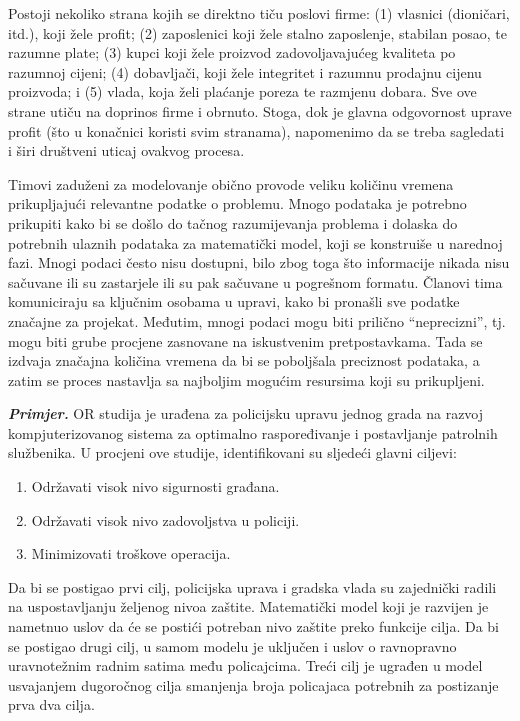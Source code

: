 \documentclass[a4paper, utf8, 11pt, colorlinks]{book}
\begin{document}
Postoji nekoliko strana kojih se direktno tiču poslovi firme: (1) vlasnici (dioničari, itd.), koji žele profit;   (2) zaposlenici koji žele stalno zaposlenje, stabilan posao, te razumne plate; (3) kupci koji žele proizvod zadovoljavajućeg kvaliteta po razumnoj cijeni;
(4) dobavljači, koji žele integritet i razumnu prodajnu cijenu proizvoda; i
(5) vlada, koja želi plaćanje poreza te razmjenu dobara. Sve ove strane utiču na doprinos firme i obrnuto.  Stoga, dok je glavna odgovornost uprave profit (što u konačnici koristi svim stranama), napomenimo da se treba sagledati i širi društveni uticaj ovakvog procesa. 
 
 Timovi zaduženi za modelovanje obično provode veliku količinu vremena prikupljajući relevantne podatke o problemu. Mnogo podataka je potrebno prikupiti kako bi se došlo do tačnog razumijevanja problema i dolaska do potrebnih ulaznih podataka za matematički model, koji se konstruiše u narednoj fazi.  Mnogi  podaci često nisu dostupni, bilo zbog toga što informacije nikada nisu sačuvane ili su zastarjele ili su pak sačuvane u pogrešnom formatu.   Članovi tima komuniciraju sa ključnim osobama u upravi, kako bi pronašli sve podatke značajne za projekat. Međutim, mnogi podaci mogu biti prilično ``neprecizni'', tj. mogu biti grube procjene zasnovane na iskustvenim pretpostavkama. Tada se izdvaja značajna količina vremena da bi se poboljšala  
preciznost podataka, a zatim se proces nastavlja sa najboljim mogućim resursima koji su prikupljeni. 

\textbf{\textit{Primjer.}}  OR studija je urađena za policijsku upravu jednog grada %
na razvoj kompjuterizovanog sistema za optimalno raspoređivanje i postavljanje patrolnih službenika. U procjeni   ove studije, identifikovani su sljedeći glavni ciljevi:
\begin{enumerate}
    \item  Održavati visok nivo sigurnosti građana.
    \item  Održavati visok nivo zadovoljstva u policiji.
     \item Minimizovati troškove operacija.
\end{enumerate}
Da bi se postigao prvi cilj, policijska uprava i gradska vlada  su zajednički radili na uspostavljanju željenog nivoa zaštite.  Matematički model koji je razvijen je nametnuo uslov da će se postići potreban nivo zaštite preko funkcije cilja.  Da bi se postigao drugi cilj, u samom modelu je uključen i uslov o ravnopravno uravnotežnim radnim satima među policajcima. Treći cilj je ugrađen u model usvajanjem dugoročnog cilja smanjenja broja policajaca potrebnih za postizanje prva dva cilja. 
\end{document}
